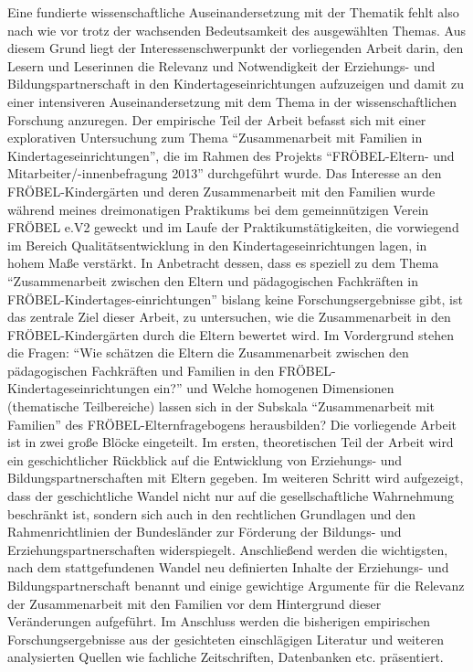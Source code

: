 \documentclass[12pt,a4paper]{article}
\begin{document}
Eine fundierte wissenschaftliche Auseinandersetzung mit der Thematik fehlt also nach wie vor trotz der wachsenden Bedeutsamkeit des ausgewählten Themas. 
Aus diesem Grund liegt der Interessenschwerpunkt der vorliegenden Arbeit darin, den Lesern und Leserinnen die Relevanz und Notwendigkeit der Erziehungs- und Bildungspartnerschaft in den Kindertageseinrichtungen aufzuzeigen und damit zu einer intensiveren Auseinandersetzung mit dem Thema in der wissenschaftlichen Forschung anzuregen.
	Der empirische Teil der Arbeit befasst sich mit einer explorativen Untersuchung zum Thema "`Zusammenarbeit mit Familien in Kindertageseinrichtungen"', die im Rahmen des Projekts "`FRÖBEL-Eltern- und Mitarbeiter/-innenbefragung 2013"' durchgeführt wurde. Das Interesse an den FRÖBEL-Kindergärten und deren Zusammenarbeit mit den Familien wurde während meines dreimonatigen Praktikums bei dem gemeinnützigen Verein FRÖBEL e.V2 geweckt und im Laufe der Praktikumstätigkeiten, die vorwiegend im Bereich Qualitätsentwicklung in den Kindertageseinrichtungen lagen, in hohem Maße verstärkt.
	In Anbetracht dessen, dass es speziell zu dem Thema "`Zusammenarbeit zwischen den Eltern und pädagogischen Fachkräften in FRÖBEL-Kindertages-einrichtungen"' bislang keine Forschungsergebnisse gibt, ist das zentrale Ziel dieser Arbeit, zu untersuchen, wie die Zusammenarbeit in den FRÖBEL-Kindergärten durch die Eltern bewertet wird. Im Vordergrund stehen die Fragen: "`Wie schätzen die Eltern die Zusammenarbeit zwischen den pädagogischen Fachkräften und Familien in den FRÖBEL-Kindertageseinrichtungen ein?"' und Welche homogenen Dimensionen (thematische Teilbereiche) lassen sich in der Subskala "`Zusammenarbeit mit Familien"' des FRÖBEL-Elternfragebogens herausbilden?
Die vorliegende Arbeit ist in zwei große Blöcke eingeteilt. Im ersten, theoretischen Teil der Arbeit wird ein geschichtlicher Rückblick auf die Entwicklung von Erziehungs- und Bildungspartnerschaften mit Eltern gegeben. Im weiteren Schritt  wird aufgezeigt, dass der geschichtliche Wandel nicht nur auf die gesellschaftliche Wahrnehmung beschränkt ist, sondern sich auch in den rechtlichen Grundlagen und den Rahmenrichtlinien der Bundesländer zur Förderung der Bildungs- und Erziehungspartnerschaften widerspiegelt. Anschließend werden die wichtigsten, nach dem stattgefundenen Wandel neu definierten Inhalte der Erziehungs- und Bildungspartnerschaft benannt und einige gewichtige Argumente für die Relevanz der Zusammenarbeit mit den Familien vor dem Hintergrund dieser Veränderungen aufgeführt. Im Anschluss werden die bisherigen empirischen Forschungsergebnisse aus der gesichteten einschlägigen Literatur und weiteren analysierten Quellen wie fachliche Zeitschriften, Datenbanken etc. präsentiert.
\end{document}
